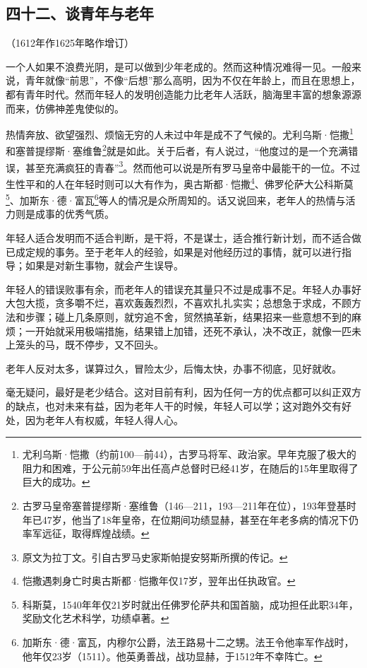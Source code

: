 \subsection*{四十二、谈青年与老年}
\begin{center}
    （1612年作1625年略作增订）
\end{center}
\par 一个人如果不浪费光阴，是可以做到少年老成的。然而这种情况难得一见。一般来说，青年就像“前思”，不像“后想”那么高明，因为不仅在年龄上，而且在思想上，都有青年时代。然而年轻人的发明创造能力比老年人活跃，脑海里丰富的想象源源而来，仿佛神差鬼使似的。
\par 热情奔放、欲望强烈、烦恼无穷的人未过中年是成不了气候的。尤利乌斯·恺撒\footnote{尤利乌斯·恺撒（约前100—前44），古罗马将军、政治家。早年克服了极大的阻力和困难，于公元前59年出任高卢总督时已经41岁，在随后的15年里取得了巨大的成功。}和塞普提缪斯·塞维鲁\footnote{古罗马皇帝塞普提缪斯·塞维鲁（146—211，193—211年在位），193年登基时年已47岁，他当了18年皇帝，在位期间功绩显赫，甚至在年老多病的情况下仍率军远征，取得辉煌战绩。}就是如此。关于后者，有人说过，“他度过的是一个充满错误，甚至充满疯狂的青春”\footnote{原文为拉丁文。引自古罗马史家斯帕提安努斯所撰的传记。}。然而他可以说是所有罗马皇帝中最能干的一位。不过生性平和的人在年轻时则可以大有作为，奥古斯都·恺撒\footnote{恺撒遇刺身亡时奥古斯都·恺撒年仅17岁，翌年出任执政官。}、佛罗伦萨大公科斯莫\footnote{科斯莫，1540年年仅21岁时就出任佛罗伦萨共和国首脑，成功担任此职34年，奖励文化艺术科学，功绩卓著。}、加斯东·德·富瓦\footnote{加斯东·德·富瓦，内穆尔公爵，法王路易十二之甥。法王令他率军作战时，他年仅23岁（1511）。他英勇善战，战功显赫，于1512年不幸阵亡。}等人的情况是众所周知的。话又说回来，老年人的热情与活力则是成事的优秀气质。
\par 年轻人适合发明而不适合判断，是干将，不是谋士，适合推行新计划，而不适合做已成定规的事务。至于老年人的经验，如果是对他经历过的事情，就可以进行指导；如果是对新生事物，就会产生误导。
\par 年轻人的错误败事有余，而老年人的错误充其量只不过是成事不足。年轻人办事好大包大揽，贪多嚼不烂，喜欢轰轰烈烈，不喜欢扎扎实实；总想急于求成，不顾方法和步骤；碰上几条原则，就穷追不舍，贸然搞革新，结果招来一些意想不到的麻烦；一开始就采用极端措施，结果错上加错，还死不承认，决不改正，就像一匹未上笼头的马，既不停步，又不回头。
\par 老年人反对太多，谋算过久，冒险太少，后悔太快，办事不彻底，见好就收。
\par 毫无疑问，最好是老少结合。这对目前有利，因为任何一方的优点都可以纠正双方的缺点，也对未来有益，因为老年人干的时候，年轻人可以学；这对跑外交有好处，因为老年人有权威，年轻人得人心。
